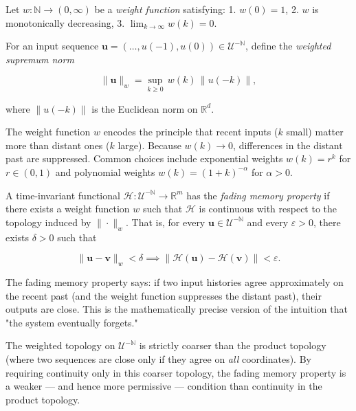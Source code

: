 \begin{definition}\label{def:15.1}
Let $w: \mathbb{N} \to (0, \infty)$
be a \textit{weight function} satisfying:
1. $w(0) = 1$,
2. $w$ is monotonically decreasing,
3. $\lim_{k \to \infty} w(k) = 0$.

For an input sequence $\mathbf{u} = (\ldots, u(-1), u(0)) \in \mathcal{U}^{-\mathbb{N}}$,
define the \textit{weighted supremum norm}

\[
\|\mathbf{u}\|_w = \sup_{k \geq 0}\, w(k)\, \|u(-k)\|,
\]

where $\|u(-k)\|$ is the Euclidean norm on $\mathbb{R}^d$.

The weight function $w$ encodes the principle that recent inputs ($k$ small) matter
more than distant ones ($k$ large). Because $w(k) \to 0$, differences in the distant
past are suppressed. Common choices include exponential weights $w(k) = r^k$ for
$r \in (0,1)$ and polynomial weights $w(k) = (1+k)^{-\alpha}$ for $\alpha > 0$.
\end{definition}


\begin{definition}\label{def:15.2}
A time-invariant functional
$\mathcal{H}: \mathcal{U}^{-\mathbb{N}} \to \mathbb{R}^m$ has the \textit{fading memory property}
if there exists a weight function $w$ such that $\mathcal{H}$ is continuous with respect
to the topology induced by $\|\cdot\|_w$. That is, for every $\mathbf{u} \in \mathcal{U}^{-\mathbb{N}}$
and every $\varepsilon > 0$, there exists $\delta > 0$ such that

\[
\|\mathbf{u} - \mathbf{v}\|_w < \delta \implies \|\mathcal{H}(\mathbf{u}) - \mathcal{H}(\mathbf{v})\| < \varepsilon.
\]

The fading memory property says: if two input histories agree approximately on the
recent past (and the weight function suppresses the distant past), their outputs are
close. This is the mathematically precise version of the intuition that "the system
eventually forgets."
\end{definition}


\begin{remark}
The weighted topology on $\mathcal{U}^{-\mathbb{N}}$ is strictly
coarser than the product topology (where two sequences are close only if they agree
on \textit{all} coordinates). By requiring continuity only in this coarser topology, the
fading memory property is a weaker --- and hence more permissive --- condition than
continuity in the product topology.
\end{remark}


